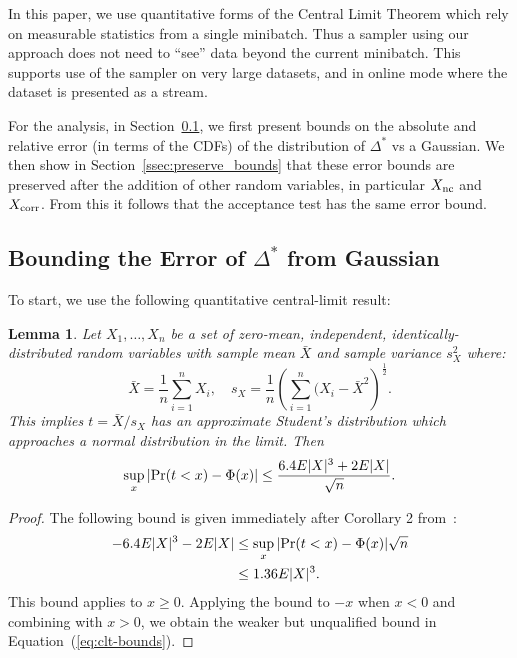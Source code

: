 \documentclass[twoside]{article} \usepackage{aistats2017}
\newtheorem{lemma}{Lemma}
\begin{document}
In this paper, we use quantitative forms of the Central Limit Theorem which rely
on measurable statistics from a single minibatch. Thus a sampler using our
approach does not need to ``see'' data beyond the current minibatch. This
supports use of the sampler on very large datasets, and in online mode where the
dataset is presented as a stream.

For the analysis, in Section~\ref{ssec:delta_star_distribution}, we first
present bounds on the absolute and relative error (in terms of the CDFs) of the
distribution of $\Delta^*$ vs a Gaussian. We then show in
Section~\ref{ssec:preserve_bounds} that these error bounds are preserved after
the addition of other random variables, in particular $X_{\rm nc}$ and $X_{\rm
corr}$. From this it follows that the acceptance test has the same error bound.

\subsection{Bounding the Error of $\Delta^*$ from Gaussian}\label{ssec:delta_star_distribution}

To start, we use the following quantitative central-limit result:
  
\begin{lemma}\label{lem:quant_clt}
Let $X_1,\ldots,X_n$ be a set of zero-mean, independent, identically-distributed
random variables with sample mean $\bar{X}$ and sample variance $s^2_X$
where:
\begin{equation}
    \bar{X} = \frac{1}{n}\sum_{i=1}^nX_i, \quad s_X = \frac{1}{n}\left(\sum_{i=1}^n(X_i-\bar{X}^2\right)^{\frac{1}{2}}.
\end{equation}
This implies $t=\bar{X}/s_X$ has an approximate Student's distribution
which approaches a normal distribution in the limit. Then
\begin{equation}\label{eq:clt-bounds}
    \sup_x|{\rm Pr}(t<x) - \Phi(x)| \leq \frac{6.4E|X|^3+2E|X|}{\sqrt{n}}.
\end{equation}
\end{lemma}

\begin{proof}
The following bound is given immediately after Corollary 2 from~\citet{explicit-clt05}:
\begin{equation}\label{eq:clt-boundsx}
\begin{split}
-6.4E|X|^3-2E|X| &\leq \sup_x|{\rm Pr}(t<x)-\Phi(x)|{\sqrt{n}} \\
&\leq 1.36E|X|^3.
\end{split}
\end{equation}
This bound applies to $x\geq 0$. Applying the bound to $-x$ when $x<0$
and combining with $x>0$, we obtain the weaker but unqualified bound
in Equation~(\ref{eq:clt-bounds}).
\end{proof}
\end{document}
